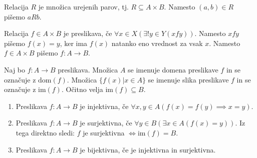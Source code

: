 \begin{definicija}
    Relacija $R$ je množica urejenih parov, tj. $R \subseteq A \times B$.
    Namesto $(a, b) \in R$ pišemo $aRb$.
\end{definicija}

\begin{definicija}
    Relacija $f \in A \times B$ je preslikava, če $\forall x \in X(\exists! y \in Y(xfy))$.
    Namesto $xfy$ pišemo $f(x) = y$, ker ima $f(x)$ natanko eno vrednost za vsak $x$.
    Namesto $f \in A \times B$ pišemo $f: A \to B$.
\end{definicija}

\begin{definicija}
    Naj bo $f: A \to B$ preslikava. Množica $A$ se imenuje domena preslikave $f$ in se označuje z $\text{dom}(f)$.
    Množica $\{f(x) | x \in A\}$ se imenuje slika preslikave $f$ in se označuje z $\text{im}(f)$.
    Očitno velja $\text{im}(f) \subseteq B$.
\end{definicija}

\begin{definicija}
    \begin{enumerate}
        \item Preslikava $f: A \to B$ je injektivna, če $\forall x, y \in A(f(x) = f(y) \implies x = y)$.
        \item Preslikava $f: A \to B$ je surjektivna, če $\forall y \in B(\exists x \in A(f(x) = y))$.
        Iz tega direktno sledi: $f$ je surjektivna $\iff \text{im}(f) = B$.
        \item Preslikava $f: A \to B$ je bijektivna, če je injektivna in surjektivna.
    \end{enumerate}
\end{definicija}